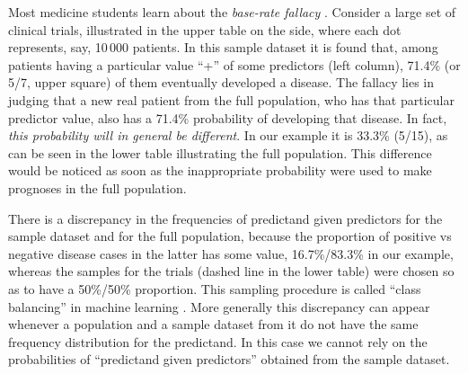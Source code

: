 \documentclass[utf8]{FrontiersinHarvard} %
\renewcommand*{\|}[1][]{\nonscript\:#1\vert\nonscript\:\mathopen{}}
\begin{document}
Most medicine students learn about the \emph{base-rate fallacy} \citep{barhillel1980,jennyetal2018,sprengeretal2021,matthews1996}. Consider a large set of clinical trials, illustrated in the upper table on the side, where each dot represents, say, 10\,000 patients. In this sample dataset it is found that, among patients having a particular value \enquote{+} of some predictors (left column), 71.4\% (or 5/7, upper square) of them eventually developed a disease. The fallacy lies in judging that a new real patient from the full population, who has that particular predictor value, also has a 71.4\% probability of developing that disease. In fact, \emph{this probability will in general be different}. In our example it is 33.3\% (5/15), as can be seen in the lower table illustrating the full population. This difference would be noticed as soon as the inappropriate probability were used to make prognoses in the full population.

There is a discrepancy in the frequencies of predictand given predictors for the sample dataset and for the full population, because the proportion of positive vs negative disease cases in the latter has some value, 16.7\%/83.3\% in our example, whereas the samples for the trials (dashed line in the lower table) were chosen so as to have a 50\%/50\% proportion. This sampling procedure is called \enquote{class balancing} in machine learning \citep{provost2000,drummondetal2005,weissetal2003}. More generally this discrepancy can appear whenever a population and a sample dataset from it do not have the same frequency distribution for the predictand. In this case we cannot rely on the probabilities of \enquote{predictand given predictors} obtained from the sample dataset.
\end{document}
